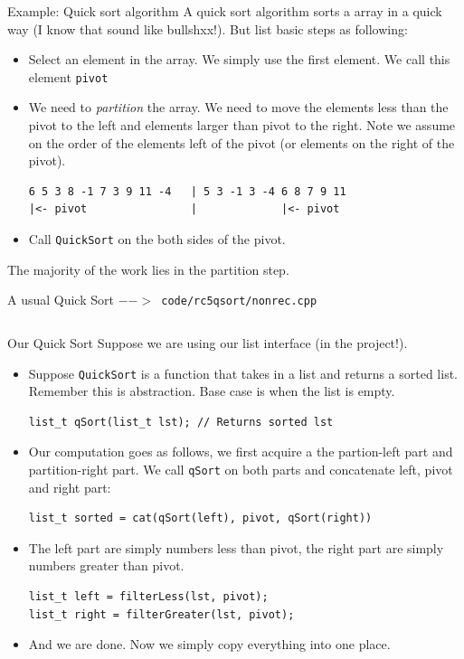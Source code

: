 \begin{frame}[fragile]{Example: Quick sort algorithm}
A quick sort algorithm sorts a array in a quick way (I know that sound like bullshxx!). But list basic steps as following:
\begin{itemize}
	\item Select an element in the array. We simply use the first element. We call this element \texttt{pivot}
	\item We need to \textit{partition} the array. We need to move the elements less than the pivot to the left and elements larger than pivot to the right. Note we assume on the order of the elements left of the pivot (or elements on the right of the pivot).
\begin{verbatim}
6 5 3 8 -1 7 3 9 11 -4   | 5 3 -1 3 -4 6 8 7 9 11
|<- pivot                |             |<- pivot
\end{verbatim}
	\item Call \texttt{QuickSort} on the both sides of the pivot.
\end{itemize}
The majority of the work lies in the partition step. 
\end{frame}

\begin{frame}{A usual Quick Sort}
\texttt{$-->$ code/rc5qsort/nonrec.cpp}
\inputminted{c++}{code/rc5qsort/nonrec.cpp}
\end{frame}

\begin{frame}[fragile]{Our Quick Sort}
Suppose we are using our list interface (in the project!). 
\begin{itemize}
	\item Suppose \texttt{QuickSort} is a function that takes in a list and returns a sorted list. Remember this is abstraction. Base case is when the list is empty.
\begin{verbatim}
list_t qSort(list_t lst); // Returns sorted lst 
\end{verbatim}

	\item Our computation goes as follows, we first acquire a the partion-left part and partition-right part. We call \texttt{qSort} on both parts and concatenate left, pivot and right part:
\begin{verbatim}
list_t sorted = cat(qSort(left), pivot, qSort(right)) 
\end{verbatim}
	\item The left part are simply numbers less than pivot, the right part are simply numbers greater than pivot.
\begin{verbatim}
list_t left = filterLess(lst, pivot);
list_t right = filterGreater(lst, pivot);
\end{verbatim}
	\item And we are done. Now we simply copy everything into one place.
\end{itemize}
\end{frame}

